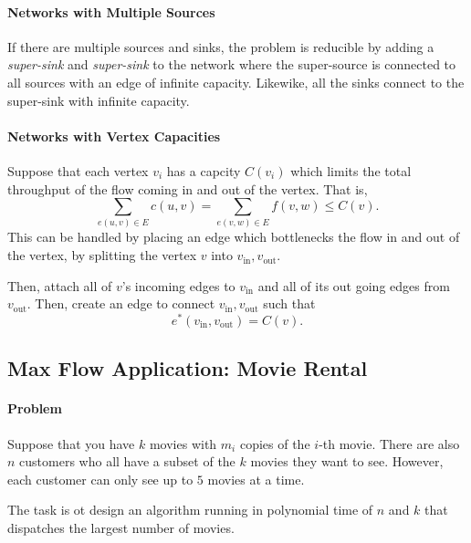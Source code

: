 \paragraph{Networks with Multiple Sources}
If there are multiple sources and sinks, the problem is reducible by
adding a \textit{super-sink} and \textit{super-sink} to the network
where the super-source is connected to all sources with an edge of infinite
capacity. Likewike, all the sinks connect to the super-sink with infinite
capacity.

\paragraph{Networks with Vertex Capacities}
Suppose that each vertex \(v_i\) has a capcity \(C(v_i)\) which limits the total
throughput of the flow coming in and out of the vertex.
That is, \[
  \sum_{e(u, v) \in E} c(u, v) = \sum_{e(v, w)\in E}f(v, w) \leq C(v)
.\] 
This can be handled by placing an edge which bottlenecks the flow in and out of
the vertex, by splitting the vertex \(v\) into  \(v_{\mathrm{in}}, v_{\mathrm{out}}\).

Then, attach all of \(v\)'s incoming edges to \(v_{\mathrm{in}}\) and all of
its out going edges from  \(v_{\mathrm{out}}\).
Then, create an edge to connect  \(v_{\mathrm{in}}, v_{\mathrm{out}}\) such that  \[
  e^*(v_{\mathrm{in}}, v_{\mathrm{out}}) = C(v)
.\] 

\subsection{Max Flow Application: Movie Rental}

\paragraph{Problem}
Suppose that you have \(k\) movies with  \(m_i\) copies of the \(i\)-th movie.
There are also \(n\) customers who all have a subset of the  \(k\)
movies they want to see. However, each customer can only see up to \(5\) 
movies at a time.

The task is ot design an algorithm running in polynomial time of \(n\) and
\(k\) that dispatches the largest number of movies.

